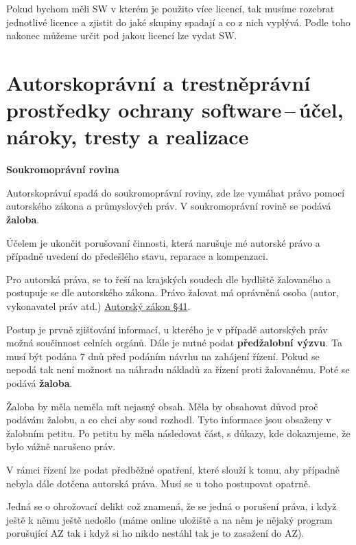 Pokud bychom měli SW v kterém je použito více licencí, tak musíme rozebrat jednotlivé licence a zjistit do jaké skupiny spadají a co z nich vyplývá. Podle toho nakonec můžeme určit pod jakou licencí lze vydat SW.










\newpage
\section{Autorskoprávní a trestněprávní prostředky ochrany software\,--\,účel, nároky, tresty a realizace}

\begin{Large}
\textbf{Soukromoprávní rovina}
\end{Large}

Autorskoprávní spadá do soukromoprávní roviny, zde lze vymáhat právo pomocí autorského zákona a průmyslových práv. V soukromoprávní rovině se podává \textbf{žaloba}.

Účelem je ukončit porušovaní činnosti, která narušuje mé autorské právo a případně uvedení do předešlého stavu, reparace a kompenzaci. 

Pro autorská práva, se to řeší na krajských soudech dle bydliště žalovaného a postupuje se dle autorského zákona. Právo žalovat má oprávněná osoba (autor, vykonavatel práv atd.) \href{https://www.zakonyprolidi.cz/cs/2000-121#p41}{Autorský zákon §41}.

Postup je prvně zjišťování informací, u kterého je v případě autorských práv možná součinnost celních orgánů. Dále je nutné podat \textbf{předžalobní výzvu}. Ta musí být podána 7 dnů před podáním návrhu na zahájení řízení. Pokud se nepodá tak není možnost na náhradu nákladů za řízení proti žalovanému. Poté se podává \textbf{žaloba}.

Žaloba by měla neměla mít nejasný obsah. Měla by obsahovat důvod proč podávám žalobu, a co chci aby soud rozhodl. Tyto informace jsou obsaženy v žalobním petitu. Po petitu by měla následovat část, s důkazy, kde dokazujeme, že bylo vážně narušeno práv.

V rámci řízení lze podat předběžné opatření, které slouží k tomu, aby případně nebyla dále dotčena autorská práva. Musí se u toho postupovat opatrně.

Jedná se o ohrožovací delikt což znamená, že se jedná o porušení práva, i když ještě k němu ještě nedošlo (máme online uložiště a na něm je nějaký program porušující AZ tak i když si ho nikdo nestáhl tak je to zasažení do AZ). 

